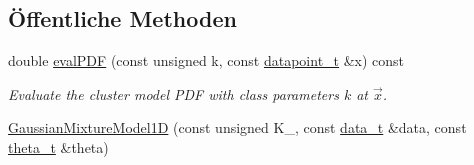\subsection*{Öffentliche Methoden}
\begin{DoxyCompactItemize}
\item 
double \hyperlink{classCDA_1_1GaussianMixtureModel1D_a8d84c546b0e23b84ee662327934b1c8b}{evalPDF} (const unsigned k, const \hyperlink{classCDA_1_1GaussianMixtureModel1D_a72f70fc9a6a659f61bcaf74597d82aa7}{datapoint\_\-t} \&x) const 
\begin{DoxyCompactList}\small\item\em Evaluate the cluster model PDF with class parameters $k$ at $\vec{x}$. \item\end{DoxyCompactList}\item 
\hypertarget{classCDA_1_1GaussianMixtureModel1D_ac2fa16c1818c09c374ef8285ac456fa9}{
\hyperlink{classCDA_1_1GaussianMixtureModel1D_ac2fa16c1818c09c374ef8285ac456fa9}{GaussianMixtureModel1D} (const unsigned K\_\-, const \hyperlink{classCDA_1_1EMData}{data\_\-t} \&data, const \hyperlink{classCDA_1_1EMThetas}{theta\_\-t} \&theta)}
\label{classCDA_1_1GaussianMixtureModel1D_ac2fa16c1818c09c374ef8285ac456fa9}


\end{DoxyCompactItemize}
